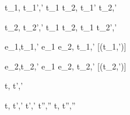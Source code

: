  {t_1,\sigma {} t_1',\sigma'}
  {t_1 \Choose t_2,\sigma {} t_1' \Choose t_2,\sigma'}

  {t_2,\sigma {} t_2',\sigma' }
  {t_1 \Choose t_2,\sigma {} t_1 \Choose t_2',\sigma'}


  {e_1,\sigma \normalise t_1,\sigma'}
  {e_1 \Pick e_2,\sigma \xrightarrow[]{\Left} t_1,\sigma'}
  [\neg\Failing(t_1,\sigma')]

  {e_2,\sigma \normalise t_2,\sigma'}
  {e_1 \Pick e_2,\sigma \xrightarrow[]{\Right} t_2,\sigma'}
  [\neg\Failing(t_2,\sigma')]




  {t,\sigma {} t',\sigma'}



  {t,\sigma {} t',\sigma' \Quad
   t',\sigma' \normalise t'',\sigma''}
  {t,\sigma {} t'',\sigma''}
